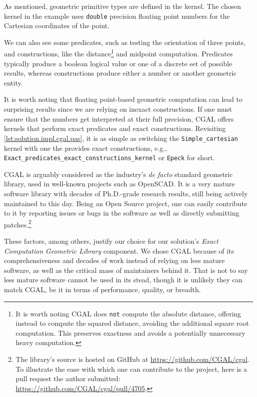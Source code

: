 As mentioned, geometric primitive types are defined in the kernel.  The chosen
kernel in the example uses \texttt{double} precision floating point numbers for
the Cartesian coordinates of the point.

We can also see some predicates, such as testing the orientation of three
points, and constructions, like the distance\footnote{It is worth noting
\ac{CGAL} does \texttt{not} compute the absolute distance, offering instead to
compute the squared distance, avoiding the additional square root computation.
This preserves exactness and avoids a potentially unnecessary heavy
computation.} and midpoint computation.  Predicates typically produce a boolean
logical value or one of a discrete set of possible results, whereas
constructions produce either a number or another geometric entity.

It is worth noting that floating point-based geometric computation can lead to
surprising results since we are relying on inexact constructions.  If one must
ensure that the numbers get interpreted at their full precision, \ac{CGAL}
offers kernels that perform exact predicates and exact constructions.
Revisiting \cref{lst:solution.impl.cgal.pas}, it is as simple as switching the
\texttt{Simple\_cartesian} kernel with one the provides exact constructions,
e.g., \texttt{Exact\_predicates\_exact\_constructions\_kernel} or \texttt{Epeck}
for short.

\ac{CGAL} is arguably considered as the industry's \textit{de facto} standard
geometric library, used in well-known projects such as OpenSCAD.  It is a very
mature software library with decades of Ph.D.-grade research results, still
being actively maintained to this day.  Being an Open Source project, one can
easily contribute to it by reporting issues or bugs in the software as well as
directly submitting patches.\footnote{The library's source is hosted on GitHub
at \url{https://github.com/CGAL/cgal}.  To illustrate the ease with which one
can contribute to the project, here is a pull request the author submitted:
\url{https://github.com/CGAL/cgal/pull/4705}.}

These factors, among others, justify our choice for our solution's \textit{Exact
Computation Geometric Library} component.  We chose \ac{CGAL} because of its
comprehensiveness and decades of work instead of relying on less mature
software, as well as the critical mass of maintainers behind it.  That is not to
say less mature software cannot be used in its stead, though it is unlikely they
can match \ac{CGAL}, be it in terms of performance, quality, or breadth.

